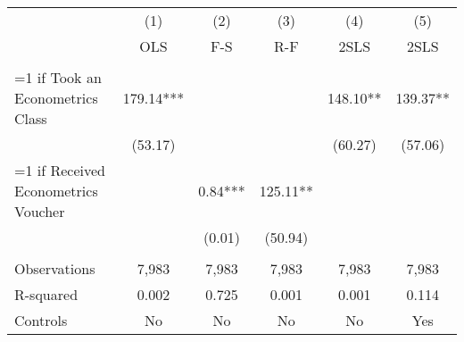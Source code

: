 \begin{tabular}{lccccc} \hline
 & (1) & (2) & (3) & (4) & (5) \\
 & OLS & F-S & R-F & 2SLS & 2SLS \\ \hline
 &  &  &  &  &  \\
=1 if Took an Econometrics Class & 179.14*** &  &  & 148.10** & 139.37** \\
 & (53.17) &  &  & (60.27) & (57.06) \\
=1 if Received Econometrics Voucher &  & 0.84*** & 125.11** &  &  \\
 &  & (0.01) & (50.94) &  &  \\
 &  &  &  &  &  \\
Observations & 7,983 & 7,983 & 7,983 & 7,983 & 7,983 \\
R-squared & 0.002 & 0.725 & 0.001 & 0.001 & 0.114 \\
 Controls & No & No & No & No & Yes \\ \hline
\end{tabular}
